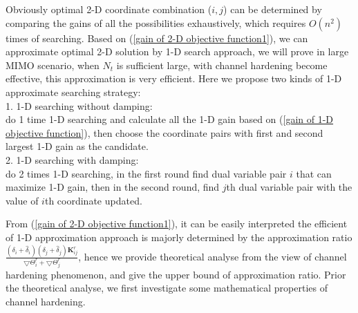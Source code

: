 \documentclass[12pt, draftclsnofoot, onecolumn]{IEEEtran}
\begin{document}
Obviously optimal 2-D coordinate combination ($i, j$) can be determined by comparing the gains of all the possibilities exhaustively, which requires $O(n^{2})$ times of searching. Based on (\ref{gain of 2-D objective function1}), we can approximate optimal 2-D solution by 1-D search approach, we will prove in large MIMO scenario, when $N_{t}$ is sufficient large, with channel hardening become effective, this approximation is very efficient. Here we propose two kinds of 1-D approximate searching strategy:\\
1. 1-D searching without damping:\\
do 1 time 1-D searching and calculate all the 1-D gain based on (\ref{gain of 1-D objective function}), then choose the coordinate pairs with first and second largest 1-D gain as the candidate.\\
2. 1-D searching with damping:\\
do 2 times 1-D searching, in the first round find dual variable pair $i$ that can maximize 1-D gain, then in the second round, find $j$th dual variable pair with the value of $i$th coordinate updated.

From (\ref{gain of 2-D objective function1}), it can be easily interpreted the efficient of 1-D approximation approach is majorly determined by the approximation ratio $\frac{(\delta_{i}+\hat{\delta}_{i})(\delta_{j}+\hat{\delta}_{j})\mathbf{K}^{r}_{ij}}{\bigtriangledown \Theta^{r}_{i}+\bigtriangledown \Theta^{r}_{j}}$, hence we provide theoretical analyse from the view of channel hardening phenomenon, and give the upper bound of approximation ratio. Prior the theoretical analyse, we first investigate some mathematical properties of channel hardening.    
\end{document}
